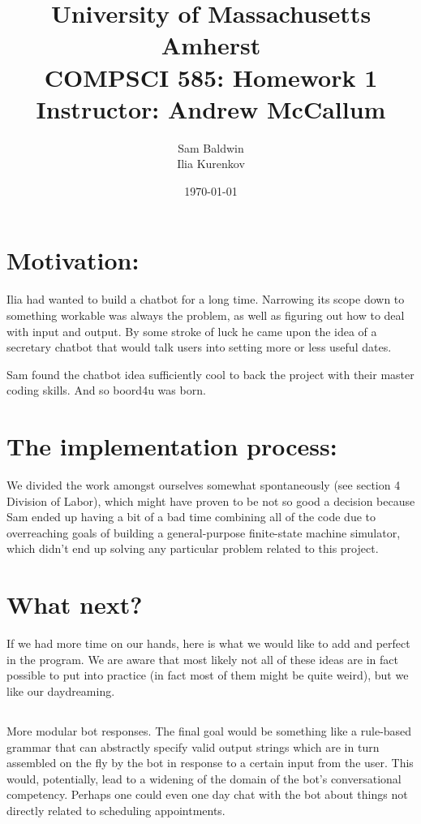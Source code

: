 \documentclass{article} %
\title{University of Massachusetts Amherst \\ COMPSCI 585: Homework 1 \\
Instructor: Andrew McCallum}
\date{\today}
\author{Sam Baldwin \\ Ilia Kurenkov}
\begin{document}
\maketitle

\section{Motivation:}

Ilia had wanted to build a chatbot for a long time. Narrowing its scope down to
something workable was always the problem, as well as figuring out how to deal
with input and output. By some stroke of luck he came upon the idea of a
secretary chatbot that would talk users into setting more or less useful dates. 

Sam found the chatbot idea sufficiently cool to back the project with their
master coding skills. And so boord4u was born.


\section{The implementation process:}
We divided the work amongst ourselves somewhat spontaneously (see section 4
Division of Labor), which might have proven to be not so good a decision
because Sam ended up having a bit of a bad time combining all of the code due
to overreaching goals of building a general-purpose finite-state machine 
simulator, which didn't end up solving any particular problem related to this
project.


\section{What next?}
If we had more time on our hands, here is what we would like to add and perfect
in the program. We are aware that most likely not all of these ideas are in
fact possible to put into practice (in fact most of them might be quite weird),
but we like our daydreaming.

\subsection{}
More modular bot responses. The final goal would be something like a rule-based
grammar that can abstractly specify valid output strings which are in turn
assembled on the fly by the bot in response to a certain input from the user.
This would, potentially, lead to a widening of the domain of the bot's
conversational competency. Perhaps one could even one day chat with the bot
about things not directly related to scheduling appointments.
\end{document}
